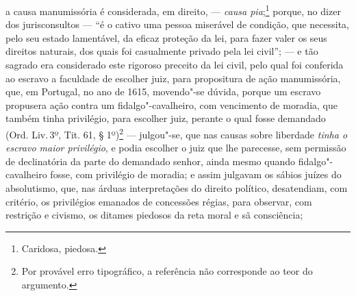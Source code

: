 a causa manumissória é considerada, em direito, --- \emph{causa
pia};\footnote{Caridosa, piedosa.} porque, no dizer dos jurisconsultos
--- ``é o cativo uma pessoa miserável de condição, que necessita, pelo
seu estado lamentável, da eficaz proteção da lei, para fazer valer os
seus direitos naturais, dos quais foi casualmente privado pela lei
civil''; --- e tão sagrado era considerado este rigoroso preceito da lei
civil, pelo qual foi conferida ao escravo a faculdade de escolher juiz,
para propositura de ação manumissória, que, em Portugal, no ano de 1615,
movendo"-se dúvida, porque um escravo propusera ação contra um
fidalgo"-cavalheiro, com vencimento de moradia, que também tinha
privilégio, para escolher juiz, perante o qual fosse demandado (Ord.
Liv.\,3º, Tit. 61, § 1º)\footnote{Por provável erro tipográfico, a
  referência não corresponde ao teor do argumento.} --- julgou"-se,
que nas causas sobre liberdade \emph{tinha o escravo maior privilégio},
e podia escolher o juiz que lhe parecesse, sem permissão de declinatória
da parte do demandado senhor, ainda mesmo quando fidalgo"-cavalheiro
fosse, com privilégio de moradia; e assim julgavam os sábios juízes do
absolutismo, que, nas árduas interpretações do direito político,
desatendiam, com critério, os privilégios emanados de concessões régias,
para observar, com restrição e civismo, os ditames piedosos da reta
moral e sã consciência;

